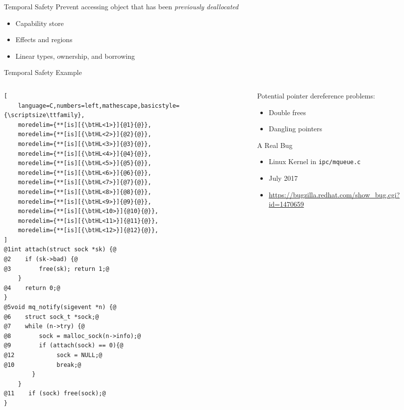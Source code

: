 \documentclass[aspectratio=169]{beamer}
\begin{document}
\begin{frame}[fragile]{Temporal Safety}
Prevent accessing object that has been \emph{previously deallocated}
\\
\pause

\begin{itemize}
   \item Capability store
   \item Effects and regions
   \item Linear types, ownership, and borrowing
\end{itemize}
\end{frame}

\begin{frame}[fragile]{Temporal Safety Example}
\begin{columns}[T]
\begin{column}{0.52\textwidth}
\begin{lstlisting}[
    language=C,numbers=left,mathescape,basicstyle={\scriptsize\ttfamily},
    moredelim={**[is][{\btHL<1>}]{@1}{@}},
    moredelim={**[is][{\btHL<2>}]{@2}{@}},
    moredelim={**[is][{\btHL<3>}]{@3}{@}},
    moredelim={**[is][{\btHL<4>}]{@4}{@}},
    moredelim={**[is][{\btHL<5>}]{@5}{@}},
    moredelim={**[is][{\btHL<6>}]{@6}{@}},
    moredelim={**[is][{\btHL<7>}]{@7}{@}},
    moredelim={**[is][{\btHL<8>}]{@8}{@}},
    moredelim={**[is][{\btHL<9>}]{@9}{@}},
    moredelim={**[is][{\btHL<10>}]{@10}{@}},
    moredelim={**[is][{\btHL<11>}]{@11}{@}},
    moredelim={**[is][{\btHL<12>}]{@12}{@}},
]
@1int attach(struct sock *sk) {@
@2    if (sk->bad) {@
@3        free(sk); return 1;@
    }
@4    return 0;@
}
@5void mq_notify(sigevent *n) {@
@6    struct sock_t *sock;@
@7    while (n->try) {@
@8        sock = malloc_sock(n->info);@
@9        if (attach(sock) == 0){@
@12            sock = NULL;@
@10            break;@
        }
    }
@11    if (sock) free(sock);@
}
\end{lstlisting}
\end{column} 
\begin{column}{0.44\textwidth}

\footnotesize{
Potential pointer dereference problems:
  \begin{itemize}
      \item Double frees
      \item Dangling pointers
  \end{itemize}
\pause

A Real Bug
 \begin{itemize}
    \item Linux Kernel in \texttt{ipc/mqueue.c}
    \item July 2017
    \item \url{https://bugzilla.redhat.com/show_bug.cgi?id=1470659}
  \end{itemize}

}
\end{column}
\end{columns}
\end{frame}
\end{document}
